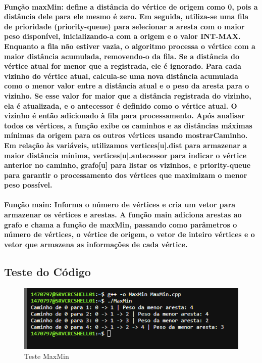 \documentclass{article}
\begin{document}
\paragraph{Função maxMin: define a distância do vértice de origem como 0, pois a distância dele para ele mesmo é zero. Em seguida, utiliza-se uma fila de prioridade (priority-queue) para selecionar a aresta com o maior peso disponível, inicializando-a com a origem e o valor INT-MAX. Enquanto a fila não estiver vazia, o algoritmo processa o vértice com a maior distância acumulada, removendo-o da fila. Se a distância do vértice atual for menor que a registrada, ele é ignorado. Para cada vizinho do vértice atual, calcula-se uma nova distância acumulada como o menor valor entre a distância atual e o peso da aresta para o vizinho. Se esse valor for maior que a distância registrada do vizinho, ela é atualizada, e o antecessor é definido como o vértice atual. O vizinho é então adicionado à fila para processamento. Após analisar todos os vértices, a função exibe os caminhos e as distâncias máximas mínimas da origem para os outros vértices usando mostrarCaminho. Em relação às variáveis, utilizamos vertices[u].dist para armazenar a maior distância mínima, vertices[u].antecessor para indicar o vértice anterior no caminho, grafo[u] para listar os vizinhos, e priority-queue para garantir o processamento dos vértices que maximizam o menor peso possível.}

\paragraph{Função main: Informa o número de vértices e cria um vetor para armazenar os vértices e arestas. A função main adiciona arestas ao grafo e chama a função de maxMin, passando como parâmetros o número de vértices, o vértice de origem, o vetor de inteiro vértices e o vetor que armazena as informações de cada vértice.}

\subsection{ Teste do Código }

\begin{figure}[h]
    \centering
    \includegraphics[width=1\textwidth]{imgs/MaxMin.PNG}
    \caption{Teste MaxMin}
    \label{fig:corr}
\end{figure}
\


\newpage

\newpage
\end{document}
